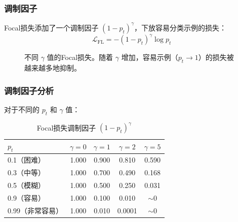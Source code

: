 \subsubsection{调制因子}

Focal损失添加了一个调制因子 $(1 - p_t)^\gamma$，下放容易分类示例的损失：
\begin{equation}
\mathcal{L}_{\text{FL}} = -(1 - p_t)^\gamma \log p_t
\end{equation}

\begin{figure}[htbp]
    \centering
    \caption[Focal损失调制]{不同 $\gamma$ 值的Focal损失。随着 $\gamma$ 增加，容易示例（$p_t \to 1$）的损失被越来越多地抑制。}
    \label{fig:focal_loss}
\end{figure}

\subsubsection{调制因子分析}

对于不同的 $p_t$ 和 $\gamma$ 值：

\begin{table}[ht]
    \centering
    \caption[Focal损失调制因子]{Focal损失调制因子 $(1 - p_t)^\gamma$}
    \begin{tabular}{L{2.5cm} c c c c}
        \toprule
        $p_t$ & $\gamma = 0$ & $\gamma = 1$ & $\gamma = 2$ & $\gamma = 5$ \\
        （困难） & 1.000 & 0.900 & 0.810 & 0.590 \\
        0.3（中等） & 1.000 & 0.700 & 0.490 & 0.168 \\
        0.5（模糊） & 1.000 & 0.500 & 0.250 & 0.031 \\
        0.9（容易） & 1.000 & 0.100 & 0.010 & $\sim$0 \\
        0.99（非常容易） & 1.000 & 0.010 & 0.0001 & $\sim$0 \\
        \bottomrule
    \end{tabular}
\end{table}

